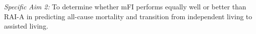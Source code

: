 \emph{Specific Aim 2:} To determine whether mFI performs equally well or better than RAI-A in predicting all-cause mortality and transition from independent living to assisted living.